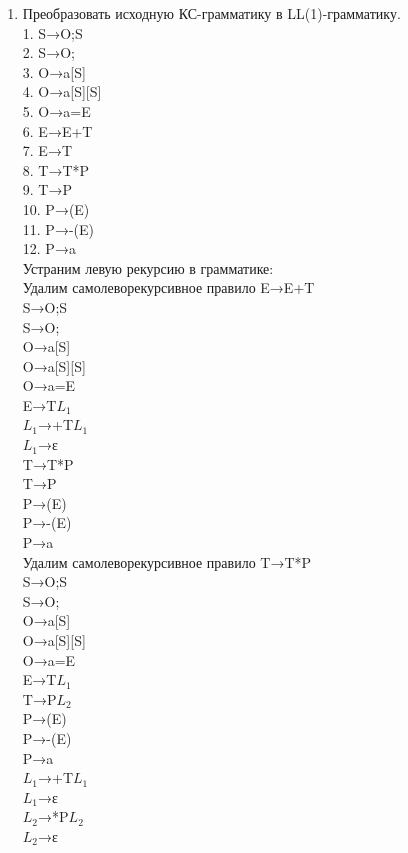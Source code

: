 \documentclass[a4paper,14pt]{extarticle}
\begin{document}
\begin{enumerate}[1.]
    \item Преобразовать исходную КС-грамматику в LL(1)-грамматику.\\
    1. S→O;S\\
    2. S→O;\\
    3. O→a[S]\\
    4. O→a[S][S]\\
    5. O→a=E\\
    6. E→E+T\\
    7. E→T\\
    8. T→T*P\\
    9. T→P\\
    10. P→(E)\\
    11. P→-(E)\\
    12. P→a\\

    Устраним левую рекурсию в грамматике:\\

    Удалим самолеворекурсивное правило E→E+T\\
    S→O;S\\
    S→O;\\
    O→a[S]\\
    O→a[S][S]\\
    O→a=E\\
    E→T$L_1$\\
    $L_1$→+T$L_1$\\
    $L_1$→ε\\
    T→T*P\\
    T→P\\
    P→(E)\\
    P→-(E)\\
    P→a\\

    Удалим самолеворекурсивное правило T→T*P\\
    S→O;S\\
    S→O;\\
    O→a[S]\\
    O→a[S][S]\\
    O→a=E\\
    E→T$L_1$\\
    T→P$L_2$\\
    P→(E)\\
    P→-(E)\\
    P→a\\
    $L_1$→+T$L_1$\\
    $L_1$→ε\\
    $L_2$→*P$L_2$\\
    $L_2$→ε\\


\end{enumerate}
\end{document}
